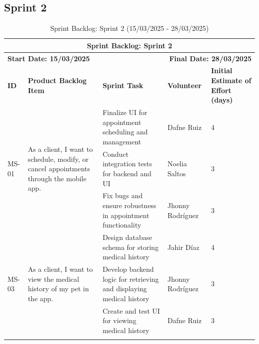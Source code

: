 \documentclass[a4paper,12pt]{report}
\begin{document}
	\subsection{Sprint 2}
	\begin{longtable}{|p{2cm}|p{4cm}|p{5cm}|p{3cm}|p{2cm}|} 
		\hline
		\multicolumn{5}{|c|}{\textbf{Sprint Backlog: Sprint 2}} \\
		\hline
		\multicolumn{2}{|l|}{\textbf{Start Date: 15/03/2025}} & \multicolumn{3}{r|}{\textbf{Final Date: 28/03/2025}} \\
		\hline
		\textbf{ID} & \textbf{Product Backlog Item} & \textbf{Sprint Task} & \textbf{Volunteer} & \textbf{Initial Estimate of Effort (days)} \\
		\hline
		\multirow{3}{*}{MS-01} 
		& \multirow{3}{4cm}{As a client, I want to schedule, modify, or cancel appointments through the mobile app.}
		& Finalize UI for appointment scheduling and management & Dafne Ruiz & 4 \\
		\cline{3-5}
		& & Conduct integration tests for backend and UI & Noelia Saltos & 3 \\
		\cline{3-5}
		& & Fix bugs and ensure robustness in appointment functionality & Jhonny Rodríguez & 3 \\
		\hline
		\multirow{3}{*}{MS-03}
		& \multirow{3}{4cm}{As a client, I want to view the medical history of my pet in the app.}
		& Design database schema for storing medical history & Jahir Díaz & 4 \\
		\cline{3-5}
		& & Develop backend logic for retrieving and displaying medical history & Jhonny Rodríguez & 3 \\
		\cline{3-5}
		& & Create and test UI for viewing medical history & Dafne Ruiz & 3 \\
		\hline
		\caption{Sprint Backlog: Sprint 2 (15/03/2025 - 28/03/2025)}
	\end{longtable}
	
	
\end{document}
